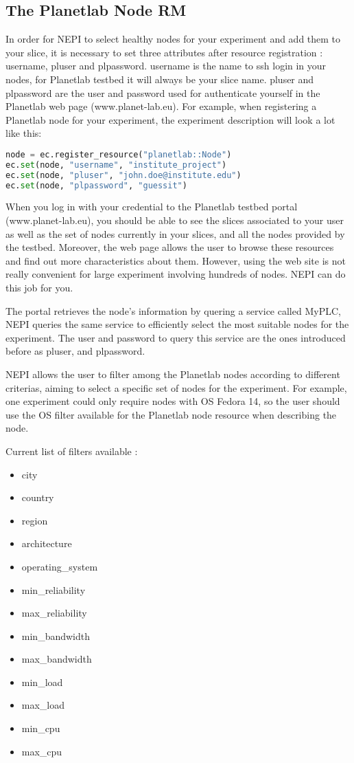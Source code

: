 \subsection{The Planetlab Node RM}

In order for NEPI to select healthy nodes for your experiment and add them to your slice, it is necessary to set three attributes after resource registration : username, pluser and plpassword. username is the name to ssh login in your nodes, for Planetlab testbed it will always be your slice
name. pluser and plpassword are the user and password used for authenticate yourself in the Planetlab web page (www.planet-lab.eu). For example, when registering a Planetlab node for your experiment, the
experiment description will look a lot like this:
\begin{lstlisting}[language=Python]
node = ec.register_resource("planetlab::Node")
ec.set(node, "username", "institute_project")
ec.set(node, "pluser", "​​john.doe@institute.edu")
ec.set(node, "plpassword", "guessit")
\end{lstlisting}
When you log in with your credential to the Planetlab testbed portal (www.planet-lab.eu), you should be able to see the slices associated to your user as well as the set of nodes currently in your slices, and all the nodes provided by the testbed. Moreover, the web page allows the user to browse these resources and find out more characteristics about them. However, using the web site is not really convenient for large experiment involving hundreds of nodes. NEPI can do this job for you.

The portal retrieves the node's information by quering a service called MyPLC, NEPI queries the same service to efficiently select the most suitable nodes for the experiment. The user and password to query this service are the ones introduced before as pluser, and plpassword.

NEPI allows the user to filter among the Planetlab nodes according to different criterias, aiming to select a specific set of nodes for the experiment. For example, one experiment could only require nodes with OS Fedora 14, so the user should use the OS filter available for the Planetlab node resource when describing the node.

Current list of filters available :
\begin{itemize}
  \item city
  \item country
  \item region
  \item architecture
  \item operating\_system
  \item min\_reliability
  \item max\_reliability
  \item min\_bandwidth
  \item max\_bandwidth
  \item min\_load
  \item max\_load
  \item min\_cpu
  \item max\_cpu
\end{itemize}

